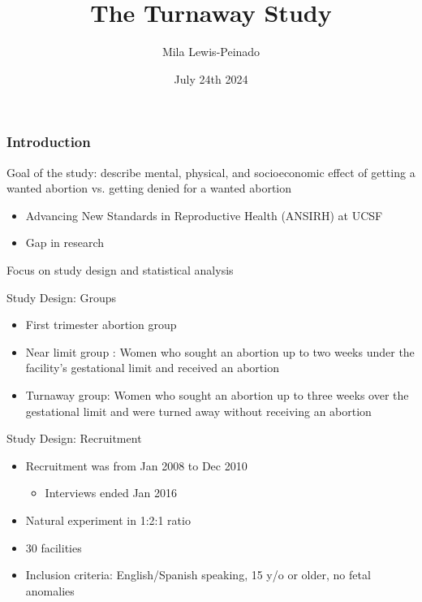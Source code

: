 \documentclass{beamer}
\title{The Turnaway Study}
\author{Mila Lewis-Peinado}
\date{July 24th 2024}
\begin{document}
\frame{\titlepage}

\begin{frame}
\frametitle{Introduction}
Goal of the study: describe mental, physical, and socioeconomic effect of getting a wanted abortion vs. getting denied for a wanted abortion

\begin{itemize}
    \item Advancing New Standards in Reproductive Health (ANSIRH) at UCSF
\end{itemize}
\begin{itemize}
    \item Gap in research
\end{itemize}
Focus on study design and statistical analysis
\end{frame}

\begin{frame}{Study Design: Groups}
    \begin{itemize}
        \item First trimester abortion group
    \end{itemize}
    \begin{itemize}
        \item Near limit group : Women who sought an abortion up to two weeks under the facility’s gestational limit and received an abortion
    \end{itemize}
    \begin{itemize}
        \item Turnaway group: Women who sought an abortion up to three weeks over the gestational limit and were turned away without receiving an abortion 
    \end{itemize}
\end{frame}

\begin{frame}{Study Design: Recruitment}
\begin{itemize}
    \item Recruitment was from Jan 2008 to Dec 2010
    \begin{itemize}
        \item Interviews ended Jan 2016
    \end{itemize}
\end{itemize}
\begin{itemize}
    \item Natural experiment in 1:2:1 ratio
\end{itemize}
\begin{itemize}
    \item 30 facilities
\end{itemize}
\begin{itemize}
    \item Inclusion criteria: English/Spanish speaking, 15 y/o or older, no fetal anomalies
\end{itemize}
\end{frame}
\end{document}
